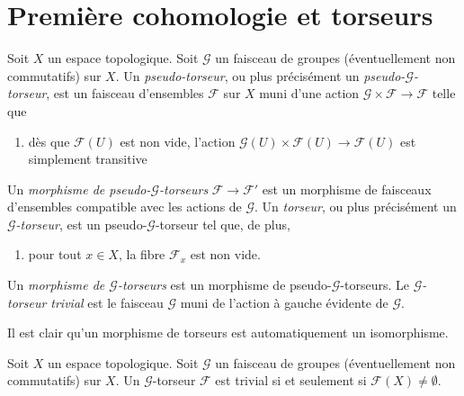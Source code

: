 \section{Première cohomologie et torseurs}

\label{section-h1-torsors}

\begin{definition}

\label{definition-torsor}

Soit $X$ un espace topologique. Soit $\mathcal{G}$ un faisceau de groupes (éventuellement non commutatifs) sur $X$. Un {\it pseudo-torseur}, ou plus précisément un {\it pseudo-$\mathcal{G}$-torseur}, est un faisceau d'ensembles $\mathcal{F}$ sur $X$ muni d'une action
$\mathcal{G} \times \mathcal{F} \to \mathcal{F}$ telle que

\begin{enumerate}

\item dès que $\mathcal{F}(U)$ est non vide, l'action
$\mathcal{G}(U) \times \mathcal{F}(U) \to \mathcal{F}(U)$
est simplement transitive

\end{enumerate}

Un {\it morphisme de pseudo-$\mathcal{G}$-torseurs}  $\mathcal{F} \to \mathcal{F}'$
est un morphisme de faisceaux d'ensembles compatible avec les
actions de $\mathcal{G}$. Un {\it torseur}, ou plus précisément un
{\it $\mathcal{G}$-torseur}, est un pseudo-$\mathcal{G}$-torseur tel que, de plus,

\begin{enumerate}

\item[(2)] pour tout $x \in X$, la fibre $\mathcal{F}_x$ est non vide.

\end{enumerate}

Un {\it morphisme de $\mathcal{G}$-torseurs} est un morphisme de pseudo-$\mathcal{G}$-torseurs. Le {\it $\mathcal{G}$-torseur trivial}
est le faisceau $\mathcal{G}$ muni de l'action à gauche évidente de
$\mathcal{G}$.

\end{definition}

\noindent
Il est clair qu'un morphisme de torseurs est automatiquement un isomorphisme.

\begin{lemma}

\label{lemma-trivial-torsor}
Soit $X$ un espace topologique. Soit $\mathcal{G}$ un faisceau de groupes (éventuellement non commutatifs) sur $X$. Un $\mathcal{G}$-torseur $\mathcal{F}$ est trivial si et seulement si $\mathcal{F}(X) \not = \emptyset$.
\end{lemma}


